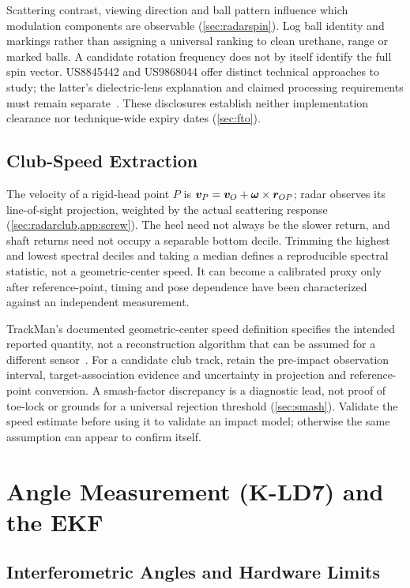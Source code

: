 Scattering contrast, viewing direction and ball pattern influence which modulation components are observable (\cref{sec:radarspin}).
Log ball identity and markings rather than assigning a universal ranking to clean urethane, range or marked balls.
A candidate rotation frequency does not by itself identify the full spin vector.
US8845442 and US9868044 offer distinct technical approaches to study; the latter's dielectric-lens explanation and claimed processing requirements must remain separate~\cite{us8845442,us9868044}.
These disclosures establish neither implementation clearance nor technique-wide expiry dates (\cref{sec:fto}).

\subsection{Club-Speed Extraction}

The velocity of a rigid-head point $P$ is $\bm{v}_P=\bm{v}_O+\bm{\omega}\times\bm{r}_{OP}$; radar observes its line-of-sight projection, weighted by the actual scattering response (\cref{sec:radarclub,app:screw}).
The heel need not always be the slower return, and shaft returns need not occupy a separable bottom decile.
Trimming the highest and lowest spectral deciles and taking a median defines a reproducible spectral statistic, not a geometric-center speed.
It can become a calibrated proxy only after reference-point, timing and pose dependence have been characterized against an independent measurement.

TrackMan's documented geometric-center speed definition specifies the intended reported quantity, not a reconstruction algorithm that can be assumed for a different sensor~\cite{trackmanclubspeed}.
For a candidate club track, retain the pre-impact observation interval, target-association evidence and uncertainty in projection and reference-point conversion.
A smash-factor discrepancy is a diagnostic lead, not proof of toe-lock or grounds for a universal rejection threshold (\cref{sec:smash}).
Validate the speed estimate before using it to validate an impact model; otherwise the same assumption can appear to confirm itself.

\section{Angle Measurement (K-LD7) and the EKF}
\label{app:ekf}

\subsection{Interferometric Angles and Hardware Limits}

